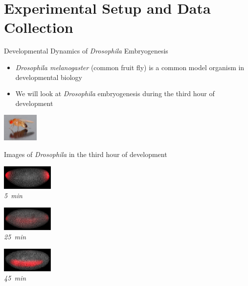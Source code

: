 \documentclass[10pt]{beamer}
\begin{document}
\section{Experimental Setup and Data Collection}

\begin{frame}{Developmental Dynamics of {\em Drosophila} Embryogenesis}

\begin{minipage}[b]{0.7\textwidth}
\vspace{0.2in}
\begin{itemize}
\item {\em Drosophila melanogaster} (common fruit fly) is a common model organism in developmental biology
\item We will look at {\em Drosophila} embryogenesis during the third hour of development
\end{itemize}
\end{minipage}
%
\hspace{0.2in}
\includegraphics[width=0.7in]{drosophila_picture}

\vspace{0.3in}

\begin{center}
Images of {\em Drosophila} in the third hour of development


\begin{minipage}{0.3\textwidth}
\centering
\includegraphics[width=1in]{longitudinal_5min}\\
{\em \scriptsize 5~min}
\end{minipage}
%
\begin{minipage}{0.3\textwidth}
\centering
\includegraphics[width=1in]{longitudinal_25min}\\
{\em \scriptsize 25~min}
\end{minipage}
%
\begin{minipage}{0.3\textwidth}
\centering
\includegraphics[width=1in]{longitudinal_45min}\\
{\em \scriptsize 45~min}
\end{minipage}


\end{center}
\end{frame}
\end{document}
